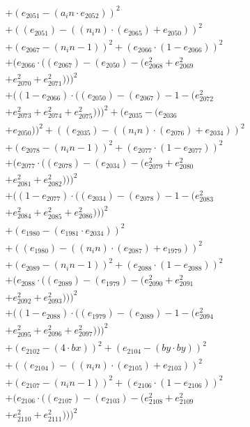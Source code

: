 \documentclass[10pt, a4paper]{article}
\begin{document}
\begin{align*}
& + (e_{2051} - (a_in  \cdot  e_{2052}))^{2} \\
& + ((e_{2051}) - ((n_in)  \cdot  (e_{2065}) + e_{2050}))^{2} \\
& + (e_{2067} - (n_in - 1))^{2} + (e_{2066}  \cdot  (1 - e_{2066}))^{2} \\
& + (e_{2066}  \cdot  ((e_{2067}) - (e_{2050}) - (e_{2068}^{2} + e_{2069}^{2} \\
& + e_{2070}^{2} + e_{2071}^{2})))^{2} \\
& + ((1 - e_{2066})  \cdot  ((e_{2050}) - (e_{2067}) - 1 - (e_{2072}^{2} \\
& + e_{2073}^{2} + e_{2074}^{2} + e_{2075}^{2})))^{2} + (e_{2035} - (e_{2036} \\
& + e_{2050}))^{2} + ((e_{2035}) - ((n_in)  \cdot  (e_{2076}) + e_{2034}))^{2} \\
& + (e_{2078} - (n_in - 1))^{2} + (e_{2077}  \cdot  (1 - e_{2077}))^{2} \\
& + (e_{2077}  \cdot  ((e_{2078}) - (e_{2034}) - (e_{2079}^{2} + e_{2080}^{2} \\
& + e_{2081}^{2} + e_{2082}^{2})))^{2} \\
& + ((1 - e_{2077})  \cdot  ((e_{2034}) - (e_{2078}) - 1 - (e_{2083}^{2} \\
& + e_{2084}^{2} + e_{2085}^{2} + e_{2086}^{2})))^{2} \\
& + (e_{1980} - (e_{1981}  \cdot  e_{2034}))^{2} \\
& + ((e_{1980}) - ((n_in)  \cdot  (e_{2087}) + e_{1979}))^{2} \\
& + (e_{2089} - (n_in - 1))^{2} + (e_{2088}  \cdot  (1 - e_{2088}))^{2} \\
& + (e_{2088}  \cdot  ((e_{2089}) - (e_{1979}) - (e_{2090}^{2} + e_{2091}^{2} \\
& + e_{2092}^{2} + e_{2093}^{2})))^{2} \\
& + ((1 - e_{2088})  \cdot  ((e_{1979}) - (e_{2089}) - 1 - (e_{2094}^{2} \\
& + e_{2095}^{2} + e_{2096}^{2} + e_{2097}^{2})))^{2} \\
& + (e_{2102} - (4  \cdot  bx))^{2} + (e_{2104} - (by  \cdot  by))^{2} \\
& + ((e_{2104}) - ((n_in)  \cdot  (e_{2105}) + e_{2103}))^{2} \\
& + (e_{2107} - (n_in - 1))^{2} + (e_{2106}  \cdot  (1 - e_{2106}))^{2} \\
& + (e_{2106}  \cdot  ((e_{2107}) - (e_{2103}) - (e_{2108}^{2} + e_{2109}^{2} \\
& + e_{2110}^{2} + e_{2111}^{2})))^{2} \\

\end{align*}
\end{document}
